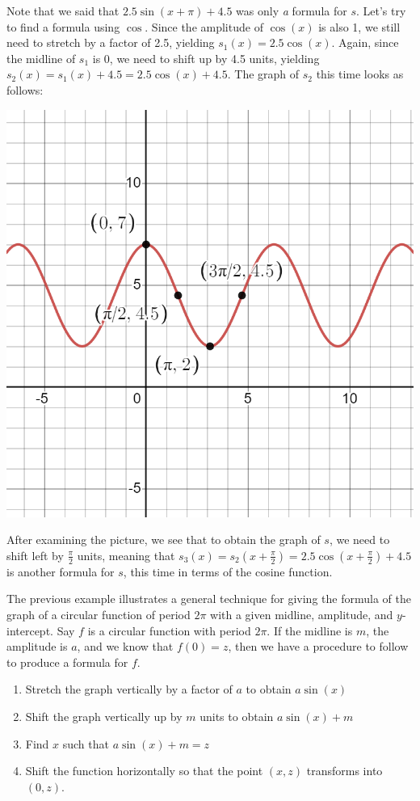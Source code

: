 \documentclass{ximera}
\begin{document}
\begin{example}
\begin{explanation}
Note that we said that $2.5\sin(x + \pi) + 4.5$ was only \emph{a} formula for $s$. Let's try to find a formula using $\cos$. Since the amplitude of $\cos(x)$ is also 1, we still need to stretch by a factor of 2.5, yielding $s_1(x) = 2.5\cos(x)$. Again, since the midline of $s_1$ is 0, we need to shift up by 4.5 units, yielding $s_2(x) = s_1(x) + 4.5 = 2.5\cos(x) + 4.5$. The graph of $s_2$ this time looks as follows:
\begin{image}
\includegraphics[width=0.8\linewidth]{images/spring-ex3.png}
\end{image}
After examining the picture, we see that to obtain the graph of $s$, we need to shift left by $\frac{\pi}{2}$ units, meaning that $s_3(x) = s_2\left(x + \frac{\pi}{2}\right) = 2.5\cos\left(x + \frac{\pi}{2}\right) + 4.5$ is another formula for $s$, this time in terms of the cosine function. 
\end{explanation}
\end{example}

The previous example illustrates a general technique for giving the formula of the graph of a circular function of period $2\pi$ with a given midline, amplitude, and $y$-intercept. Say $f$ is a circular function with period $2\pi$. If the midline is $m$, the amplitude is $a$, and we know that $f(0) = z$, then we have a procedure to follow to produce a formula for $f$. 
\begin{enumerate}
\item Stretch the graph vertically by a factor of $a$ to obtain $a\sin(x)$
\item Shift the graph vertically up by $m$ units to obtain $a\sin(x) + m$
\item Find $x$ such that $a\sin(x) + m = z$
\item Shift the function horizontally so that the point $(x, z)$ transforms into $(0, z)$. 
\end{enumerate}
\end{document}
